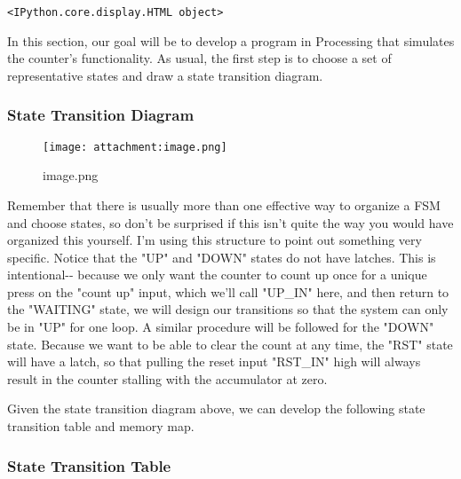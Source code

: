 \documentclass[11pt]{article}
\makeatletter
\def\maxwidth{\ifdim\Gin@nat@width>\linewidth\linewidth
    \else\Gin@nat@width\fi}
\let\Oldincludegraphics\includegraphics
\renewcommand{\includegraphics}[1]{\Oldincludegraphics[width=.8\maxwidth]{#1}}
\makeatother
\begin{document}
    
    \begin{verbatim}
<IPython.core.display.HTML object>
    \end{verbatim}

    
    In this section, our goal will be to develop a program in Processing
that simulates the counter's functionality. As usual, the first step is
to choose a set of representative states and draw a state transition
diagram.

\subsubsection{State Transition Diagram}\label{state-transition-diagram}

    \begin{figure}
\centering
\texttt{[image: attachment:image.png]}
\caption{image.png}
\end{figure}

    Remember that there is usually more than one effective way to organize a
FSM and choose states, so don't be surprised if this isn't quite the way
you would have organized this yourself. I'm using this structure to
point out something very specific. Notice that the "UP" and "DOWN"
states do not have latches. This is intentional-\/- because we only want
the counter to count up once for a unique press on the "count up" input,
which we'll call "UP\_IN" here, and then return to the "WAITING" state,
we will design our transitions so that the system can only be in "UP"
for one loop. A similar procedure will be followed for the "DOWN" state.
Because we want to be able to clear the count at any time, the "RST"
state will have a latch, so that pulling the reset input "RST\_IN" high
will always result in the counter stalling with the accumulator at zero.

Given the state transition diagram above, we can develop the following
state transition table and memory map.

\subsubsection{State Transition Table}\label{state-transition-table}
\end{document}

